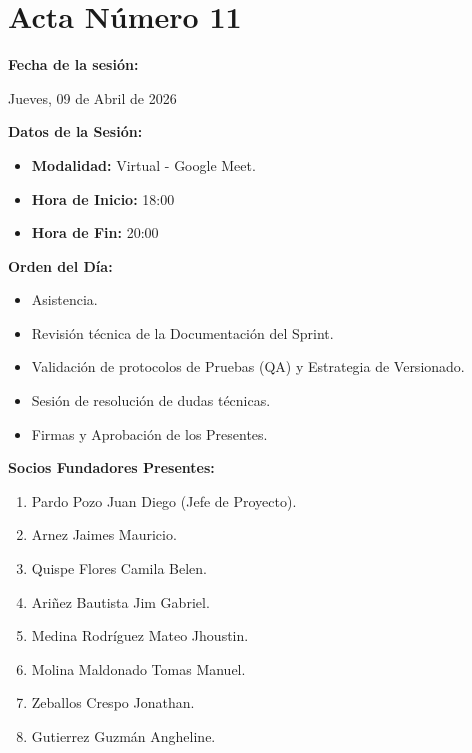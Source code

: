 \newpage
\section{Acta Número 11}
\label{sec:acta11}

\noindent \textbf{Fecha de la sesión:}\par
Jueves, 09 de Abril de 2026

\vspace*{0.5cm}
\noindent \textbf{Datos de la Sesión:}
\vspace{-0.2cm}
\begin{itemize}[noitemsep]
    \item \textbf{Modalidad:} Virtual - Google Meet.
    \item \textbf{Hora de Inicio:} 18:00
    \item \textbf{Hora de Fin:} 20:00
\end{itemize}

\vspace*{0.5cm}
\noindent \textbf{Orden del Día:}
\vspace{-0.2cm}
\begin{itemize}[noitemsep]
    \item Asistencia.
    \item Revisión técnica de la Documentación del Sprint.
    \item Validación de protocolos de Pruebas (QA) y Estrategia de Versionado.
    \item Sesión de resolución de dudas técnicas.
    \item Firmas y Aprobación de los Presentes.
\end{itemize}

\vspace*{0.5cm}
\noindent \textbf{Socios Fundadores Presentes:}
\vspace{-0.2cm}
\begin{enumerate}[noitemsep]
    \item Pardo Pozo Juan Diego (Jefe de Proyecto).
    \item Arnez Jaimes Mauricio.
    \item Quispe Flores Camila Belen.
    \item Ariñez Bautista Jim Gabriel.
    \item Medina Rodríguez Mateo Jhoustin.
    \item Molina Maldonado Tomas Manuel.
    \item Zeballos Crespo Jonathan.
    \item Gutierrez Guzmán Angheline.
\end{enumerate}

